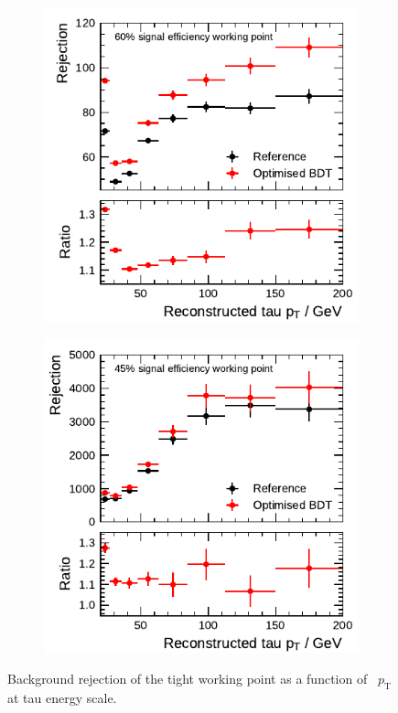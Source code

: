 \begin{figure}[htbp]
  \centering
  \begin{subfigure}[t]{0.48\textwidth}
    \centering
    \includegraphics{./figures/bdt_perf/post_optimisation/rejection_tight_1p.pdf}
  \end{subfigure}\hfill
  \begin{subfigure}[t]{0.48\textwidth}
    \centering
    \includegraphics{./figures/bdt_perf/post_optimisation/rejection_tight_3p.pdf}
  \end{subfigure}
  \caption{Background rejection of the tight working point as a function of
    \tauhadvis~$p_\text{T}$ at tau energy scale.}
  \label{fig:rejection_comparison}
\end{figure}

